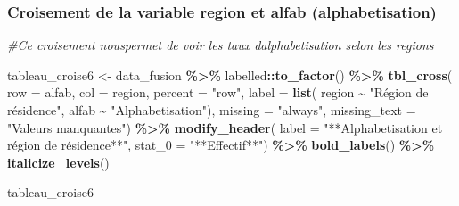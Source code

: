 \documentclass[
]{article}
\newenvironment{Shaded}{\begin{snugshade}}{\end{snugshade}}
\newcommand{\AttributeTok}[1]{\textcolor[rgb]{0.13,0.29,0.53}{#1}}
\newcommand{\CommentTok}[1]{\textcolor[rgb]{0.56,0.35,0.01}{\textit{#1}}}
\newcommand{\FunctionTok}[1]{\textcolor[rgb]{0.13,0.29,0.53}{\textbf{#1}}}
\newcommand{\NormalTok}[1]{#1}
\newcommand{\OtherTok}[1]{\textcolor[rgb]{0.56,0.35,0.01}{#1}}
\newcommand{\SpecialCharTok}[1]{\textcolor[rgb]{0.81,0.36,0.00}{\textbf{#1}}}
\newcommand{\StringTok}[1]{\textcolor[rgb]{0.31,0.60,0.02}{#1}}
\begin{document}
\subsubsection{Croisement de la variable region et alfab
(alphabetisation)}\label{croisement-de-la-variable-region-et-alfab-alphabetisation}

\begin{Shaded}
\begin{Highlighting}[]
\CommentTok{\#Ce croisement nouspermet de voir les taux d\textquotesingle{}alphabetisation selon les regions}

\NormalTok{tableau\_croise6 }\OtherTok{\textless{}{-}}\NormalTok{ data\_fusion }\SpecialCharTok{\%\textgreater{}\%}
\NormalTok{  labelled}\SpecialCharTok{::}\FunctionTok{to\_factor}\NormalTok{() }\SpecialCharTok{\%\textgreater{}\%}  
  \FunctionTok{tbl\_cross}\NormalTok{(}
    \AttributeTok{row =}\NormalTok{ alfab,  }
    \AttributeTok{col =}\NormalTok{ region,  }
    \AttributeTok{percent =} \StringTok{"row"}\NormalTok{,  }
    \AttributeTok{label =} \FunctionTok{list}\NormalTok{(}
\NormalTok{      region }\SpecialCharTok{\textasciitilde{}} \StringTok{"Région de résidence"}\NormalTok{,  }
\NormalTok{      alfab }\SpecialCharTok{\textasciitilde{}} \StringTok{"Alphabetisation"}\NormalTok{),}
    \AttributeTok{missing =} \StringTok{"always"}\NormalTok{,  }
    \AttributeTok{missing\_text =} \StringTok{"Valeurs manquantes"}\NormalTok{) }\SpecialCharTok{\%\textgreater{}\%}
  \FunctionTok{modify\_header}\NormalTok{(}
    \AttributeTok{label =} \StringTok{"**Alphabetisation et région de résidence**"}\NormalTok{,}
    \AttributeTok{stat\_0 =} \StringTok{"**Effectif**"}\NormalTok{) }\SpecialCharTok{\%\textgreater{}\%}
  \FunctionTok{bold\_labels}\NormalTok{() }\SpecialCharTok{\%\textgreater{}\%}  
  \FunctionTok{italicize\_levels}\NormalTok{()}

\NormalTok{tableau\_croise6}
\end{Highlighting}
\end{Shaded}
\end{document}
